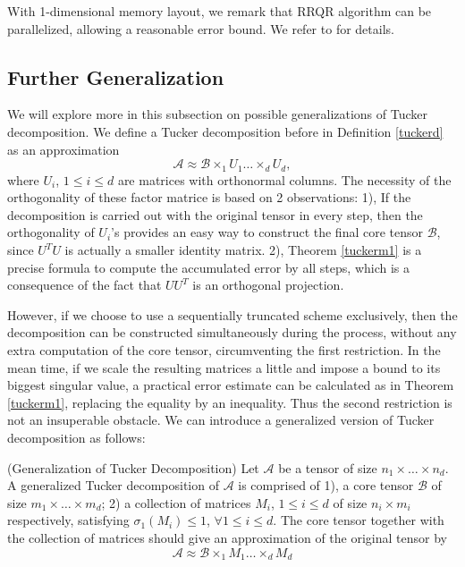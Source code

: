 \documentclass[12pt]{article}
\begin{document}
With 1-dimensional memory layout, we remark that RRQR algorithm can be parallelized, allowing a reasonable error bound. We refer to \cite{carrqr} for details.


\subsection{Further Generalization}
We will explore more in this subsection on possible generalizations of Tucker decomposition. We define a Tucker decomposition before in Definition \ref{tuckerd} as an approximation
$$ \mathcal{A} \approx \mathcal{B} \times_1 U_1 \dots \times_d U_d, $$
where $U_i$, $1 \leq i \leq d$ are matrices with orthonormal columns. The necessity of the orthogonality of these factor matrice is based on 2 observations: 1), If the decomposition is carried out with the original tensor in every step, then the orthogonality of $U_i$'s provides an easy way to construct the final core tensor $\mathcal{B}$, since $U^TU$ is actually a smaller identity matrix. 2), Theorem \ref{tuckerm1} is a precise formula to compute the accumulated error by all steps, which is a consequence of the fact that $UU^T$ is an orthogonal projection.

However, if we choose to use a sequentially truncated scheme exclusively, then the decomposition can be constructed simultaneously during the process, without any extra computation of the core tensor, circumventing the first restriction. In the mean time, if we scale the resulting matrices a little and impose a bound to its biggest singular value, a practical error estimate can be calculated as in Theorem \ref{tuckerm1}, replacing the equality by an inequality. Thus the second restriction is not an insuperable obstacle. We can introduce a generalized version of Tucker decomposition as follows:

\begin{mydef}{(Generalization of Tucker Decomposition)}
Let $\mathcal{A}$ be a tensor of size $n_1 \times \dots \times n_d$. A generalized Tucker decomposition of $\mathcal{A}$ is comprised of 1), a core tensor $\mathcal{B}$ of size $m_1 \times \dots \times m_d$; 2) a collection of matrices $M_i$, $1 \leq i \leq d$ of size $n_i \times m_i$ respectively, satisfying $\sigma_1(M_i) \leq 1$, $\forall 1 \leq i \leq d$. The core tensor together with the collection of matrices should give an approximation of the original tensor by
$$ \mathcal{A} \approx \mathcal{B} \times_1 M_1 \dots \times_d M_d $$
\end{mydef}
\end{document}
